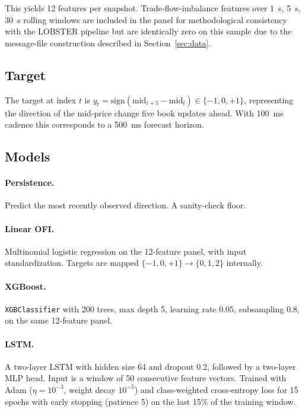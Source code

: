 \documentclass[11pt]{article}
\begin{document}
This yields 12 features per snapshot. Trade-flow-imbalance features
over 1~s, 5~s, 30~s rolling windows are included in the panel for
methodological consistency with the LOBSTER pipeline but are
identically zero on this sample due to the message-file
construction described in Section~\ref{sec:data}.

\subsection{Target}

The target at index \(t\) is
\(y_t = \mathrm{sign}(\mathrm{mid}_{t+5} - \mathrm{mid}_t) \in \{-1, 0, +1\}\),
representing the direction of the mid-price change five book updates
ahead. With 100~ms cadence this corresponds to a 500~ms forecast
horizon.

\subsection{Models}

\paragraph{Persistence.} Predict the most recently observed direction.
A sanity-check floor.

\paragraph{Linear OFI.} Multinomial logistic regression on the 12-feature
panel, with input standardization. Targets are mapped \(\{-1,0,+1\}
\to \{0,1,2\}\) internally.

\paragraph{XGBoost.} \texttt{XGBClassifier} with 200 trees, max depth 5,
learning rate 0.05, subsampling 0.8, on the same 12-feature panel.

\paragraph{LSTM.} A two-layer LSTM with hidden size 64 and dropout 0.2,
followed by a two-layer MLP head. Input is a window of 50 consecutive
feature vectors. Trained with Adam (\(\eta=10^{-3}\), weight decay
\(10^{-5}\)) and class-weighted cross-entropy loss for 15 epochs with
early stopping (patience 5) on the last 15\% of the training window.
\end{document}

